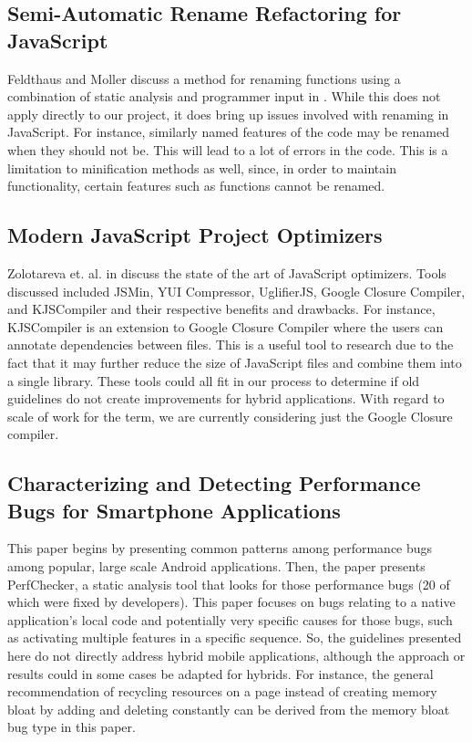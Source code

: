 \documentclass{acm_proc_article-sp}
\begin{document}
\subsection{Semi-Automatic Rename Refactoring for JavaScript \cite{feldthaus2013semi}}
Feldthaus and Moller discuss a method for renaming functions using a combination of static analysis and programmer input in \cite{feldthaus2013semi}.
While this does not apply directly to our project, it does bring up issues involved with renaming in JavaScript.
For instance, similarly named features of the code may be renamed when they should not be.
This will lead to a lot of errors in the code.
This is a limitation to minification methods as well, since, in order to maintain functionality, certain features such as functions cannot be renamed.

\subsection{Modern JavaScript Project Optimizers \cite{zolotareva2014modern}}
Zolotareva et. al. in \cite{zolotareva2014modern} discuss the state of the art of JavaScript optimizers.
Tools discussed included JSMin, YUI Compressor, UglifierJS, Google Closure Compiler, and KJSCompiler and their respective benefits and drawbacks.
For instance, KJSCompiler is an extension to Google Closure Compiler where the users can annotate dependencies between files.
This is a useful tool to research due to the fact that it may further reduce the size of JavaScript files and combine them into a single library.
These tools could all fit in our process to determine if old guidelines do not create improvements for hybrid applications.
With regard to scale of work for the term, we are currently considering just the Google Closure compiler.

\subsection{Characterizing and Detecting Performance Bugs for Smartphone Applications \cite{liu2014characterizing} }
This paper begins by presenting common patterns among performance bugs among popular, large scale Android applications.
Then, the paper presents PerfChecker, a static analysis tool that looks for those performance bugs (20 of which were fixed by developers).
This paper focuses on bugs relating to a native application’s local code and potentially very specific causes for those bugs, such as activating multiple features in a specific sequence.
So, the guidelines presented here do not directly address hybrid mobile applications, although the approach or results could in some cases be adapted for hybrids.
For instance, the general recommendation of recycling resources on a page instead of creating memory bloat by adding and deleting constantly can be derived from the memory bloat bug type in this paper.
\end{document}
